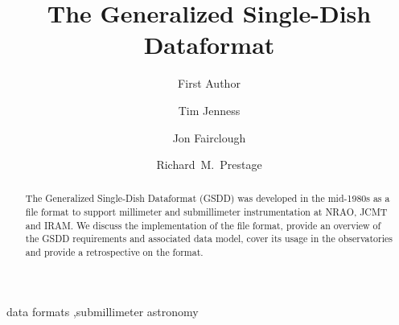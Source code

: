 \documentclass[final,authoryear,5p,times,twocolumn]{elsarticle}
\begin{document}
\begin{frontmatter}



\title{The Generalized Single-Dish Dataformat}


\author[jac]{First Author}
\author[jac]{Tim Jenness}
\author[hp]{Jon Fairclough}
\author[nrao]{Richard~M.~Prestage}





\address[jac]{Joint Astronomy Centre, 660 N.\ A`oh\=ok\=u Place, Hilo, HI 
  96720, USA}
\address[hp]{HP Enterprise Services UK Ltd}
\address[nrao]{National Radio Astronomy Observatory, P.O.\ Box 2, Green Bank, WV~24944, USA}

\begin{abstract}

The Generalized Single-Dish Dataformat (GSDD) was developed in the
mid-1980s as a file format to support millimeter and submillimeter
instrumentation at NRAO, JCMT and IRAM. We discuss the implementation
of the file format, provide an overview of the GSDD requirements and
associated data model, cover its usage in the observatories and
provide a retrospective on the format.

\end{abstract}

\begin{keyword}


data formats \sep submillimeter astronomy

\end{keyword}

\end{frontmatter}
\end{document}
